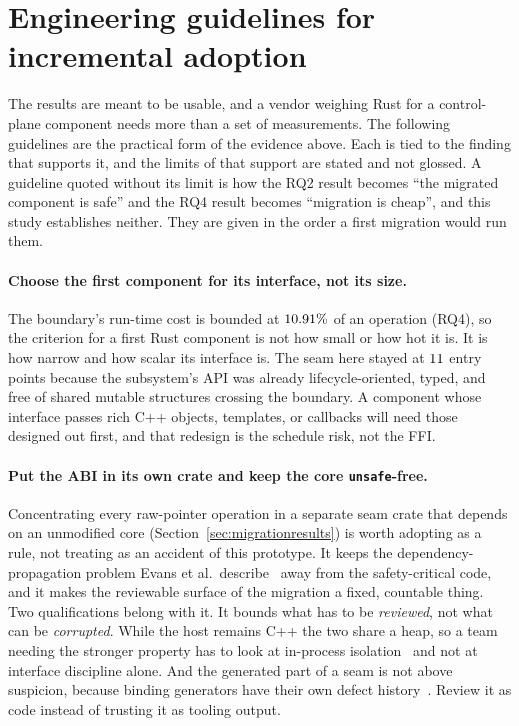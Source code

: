 \documentclass[english,oneside,a4paper,censored,csm,software-track-2020]{HYthesisML}
\begin{document}
\section{Engineering guidelines for incremental adoption}
\label{sec:guidelines}
The results are meant to be usable, and a vendor weighing Rust for a control-plane component
needs more than a set of measurements. The following guidelines are the practical form of the
evidence above. Each is tied to the finding that supports it, and the limits of that
support are stated and not glossed. A guideline quoted without its limit is how the
RQ2 result becomes ``the migrated component is safe'' and the RQ4 result becomes ``migration is
cheap'', and this study establishes neither. They are given in the order a first migration
would run them.

\paragraph{Choose the first component for its interface, not its size.}
The boundary's run-time cost is bounded at $10.91\%$ of an operation (RQ4), so the
criterion for a first Rust component is not how small or how hot it is. It is how narrow and how
scalar its interface is. The seam here stayed at $11$ entry points because the subsystem's API
was already lifecycle-oriented, typed, and free of shared mutable structures crossing the
boundary. A component whose interface passes rich C++ objects, templates, or callbacks will need
those designed out first, and that redesign is the schedule risk, not the FFI.

\paragraph{Put the ABI in its own crate and keep the core \texttt{unsafe}-free.}
Concentrating every raw-pointer operation in a separate seam crate that depends on an unmodified
core (Section~\ref{sec:migrationresults}) is worth adopting as a rule, not treating as an
accident of this prototype. It keeps the dependency-propagation problem Evans et al.\
describe~\cite{evans2020rust} away from the safety-critical code, and it makes the reviewable
surface of the migration a fixed, countable thing. Two qualifications belong with it. It bounds
what has to be \emph{reviewed}, not what can be \emph{corrupted}. While the host remains C++ the
two share a heap, so a team needing the stronger property has to look at in-process
isolation~\cite{rivera2021galeed,kirth2022pkrusafe} and not at interface discipline alone.
And the generated part of a seam is not above suspicion, because binding generators have their own
defect history~\cite{cai2026interop}. Review it as code instead of trusting it as tooling
output.
\end{document}
